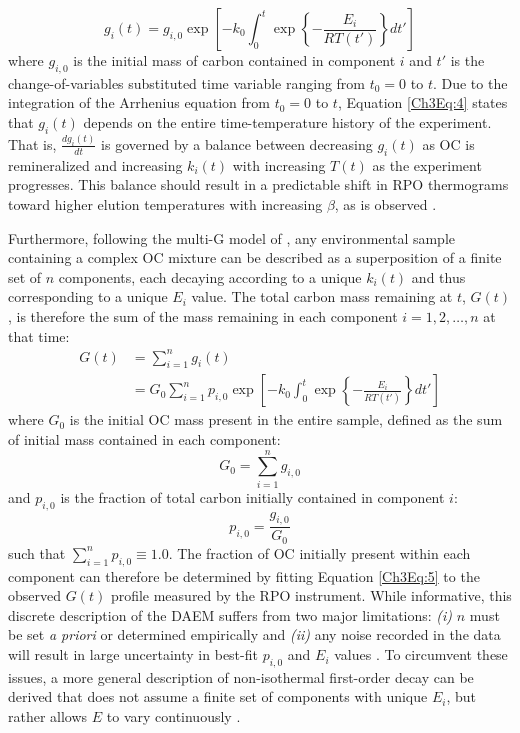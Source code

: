 %
\begin{equation}\label{Ch3Eq:4}
	g_{i}(t) = g_{i,0} \exp \left[ - k_{0} \int_{0}^{t} \exp \left\{ - \frac{E_{i}}{RT(t')} \right\} dt' \right]
\end{equation}
%
where $g_{i,0}$ is the initial mass of carbon contained in component $i$ and $t'$ is the change-of-variables substituted time variable ranging from $t_{0} = 0$ to $t$. Due to the integration of the Arrhenius equation from $t_{0} = 0$ to $t$, Equation \ref{Ch3Eq:4} states that $g_{i}(t)$ depends on the entire time-temperature history of the experiment. That is, $\frac{dg_{i}(t)}{dt}$ is governed by a balance between decreasing $g_{i}(t)$ as OC is remineralized and increasing $k_{i}(t)$ with increasing $T(t)$ as the experiment progresses. This balance should result in a predictable shift in RPO thermograms toward higher elution temperatures with increasing $\beta$, as is observed \citep[Figure \ref{Ch3Fig:3}C;][]{Braun:1987vf,Miura:1995uo,Miura:1998jf}.

Furthermore, following the multi-G model of \citet{Westrich:1984uj}, any environmental sample containing a complex OC mixture can be described as a superposition of a finite set of $n$ components, each decaying according to a unique $k_{i}(t)$ and thus corresponding to a unique $E_{i}$ value. The total carbon mass remaining at $t$, $G(t)$, is therefore the sum of the mass remaining in each component $i = 1,2,\dots,n$ at that time:
%
\begin{equation}\label{Ch3Eq:5}
	\begin{split}
		G(t) & = \sum_{i=1}^{n} g_{i}(t) \\
		& =  G_{0} \sum_{i=1}^{n} p_{i,0} \exp \left[ - k_{0} \int_{0}^{t} \exp \left\{ - \frac{E_{i}}{RT(t')} \right\} dt' \right]
	\end{split}
\end{equation}
%
where $G_{0}$ is the initial OC mass present in the entire sample, defined as the sum of initial mass contained in each component:
%
\begin{equation}\label{Ch3Eq:6}
	G_{0} = \sum_{i=1}^{n} g_{i,0}
\end{equation}
%
and $p_{i,0}$ is the fraction of total carbon initially contained in component $i$:
%
\begin{equation}\label{Ch3Eq:7}
	p_{i,0} = \frac{g_{i,0}}{G_{0}}
\end{equation}
%
such that $\sum_{i=1}^{n} p_{i,0} \equiv 1.0$. The fraction of OC initially present within each component can therefore be determined by fitting Equation \ref{Ch3Eq:5} to the observed $G(t)$ profile measured by the RPO instrument. While informative, this discrete description of the DAEM suffers from two major limitations: \textit{(i)} $n$ must be set \textit{a priori} or determined empirically \citep{Boudreau:1991wf} and \textit{(ii)} any noise recorded in the data will result in large uncertainty in best-fit $p_{i,0}$ and $E_{i}$ values \citep{Forney:2012hz}. To circumvent these issues, a more general description of non-isothermal first-order decay can be derived that does not assume a finite set of components with unique $E_{i}$, but rather allows $E$ to vary continuously \citep{Burnham:1987ut,Burnham:1999ec,Cramer:2004tg}.

